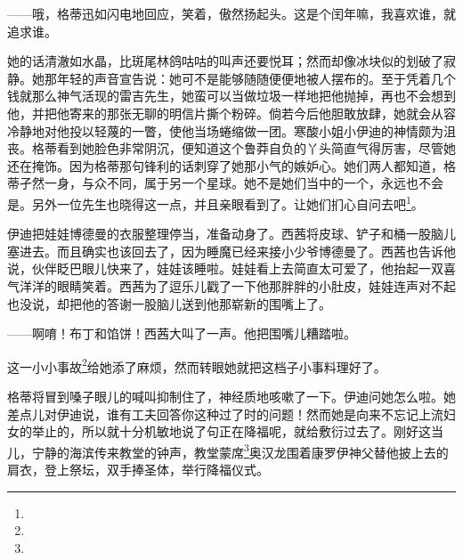 \par ——哦，格蒂迅如闪电地回应，笑着，傲然扬起头。这是个闰年嘛，我喜欢谁，就追求谁。
\par 她的话清澈如水晶，比斑尾林鸽咕咕的叫声还要悦耳；然而却像冰块似的划破了寂静。她那年轻的声音宣告说：她可不是能够随随便便地被人摆布的。至于凭着几个钱就那么神气活现的雷吉先生，她蛮可以当做垃圾一样地把他抛掉，再也不会想到他，并把他寄来的那张无聊的明信片撕个粉碎。倘若今后他胆敢放肆，她就会从容冷静地对他投以轻蔑的一瞥，使他当场蜷缩做一团。寒酸小姐小伊迪的神情颇为沮丧。格蒂看到她脸色非常阴沉，便知道这个鲁莽自负的丫头简直气得厉害，尽管她还在掩饰。因为格蒂那句锋利的话刺穿了她那小气的嫉妒心。她们两人都知道，格蒂孑然一身，与众不同，属于另一个星球。她不是她们当中的一个，永远也不会是。另外一位先生也晓得这一点，并且亲眼看到了。让她们扪心自问去吧\footnote{}。
\par 伊迪把娃娃博德曼的衣服整理停当，准备动身了。西茜将皮球、铲子和桶一股脑儿塞进去。而且确实也该回去了，因为睡魔已经来接小少爷博德曼了。西茜也告诉他说，伙伴眨巴眼儿快来了，娃娃该睡啦。娃娃看上去简直太可爱了，他抬起一双喜气洋洋的眼睛笑着。西茜为了逗乐儿戳了一下他那胖胖的小肚皮，娃娃连声对不起也没说，却把他的答谢一股脑儿送到他那崭新的围嘴上了。
\par ——啊唷！布丁和馅饼！西茜大叫了一声。他把围嘴儿糟踏啦。
\par 这一小小事故\footnote{}给她添了麻烦，然而转眼她就把这档子小事料理好了。
\par 格蒂将冒到嗓子眼儿的喊叫抑制住了，神经质地咳嗽了一下。伊迪问她怎么啦。她差点儿对伊迪说，谁有工夫回答你这种过了时的问题！然而她是向来不忘记上流妇女的举止的，所以就十分机敏地说了句正在降福呢，就给敷衍过去了。刚好这当儿，宁静的海滨传来教堂的钟声，教堂蒙席\footnote{}奥汉龙围着康罗伊神父替他披上去的肩衣，登上祭坛，双手捧圣体，举行降福仪式。
